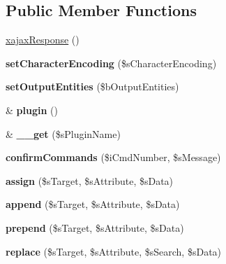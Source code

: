 \subsection*{Public Member Functions}
\begin{DoxyCompactItemize}
\item 
\hyperlink{classxajaxResponse_a0fdc8a869e328a8b4b6472ae7acc0d23}{xajaxResponse} ()
\item 
\hypertarget{classxajaxResponse_ab00a867a4c5dcdf5493329ea47072735}{
{\bfseries setCharacterEncoding} (\$sCharacterEncoding)}
\label{classxajaxResponse_ab00a867a4c5dcdf5493329ea47072735}

\item 
\hypertarget{classxajaxResponse_a59b3d278398a4d2308eb4adfd97668ad}{
{\bfseries setOutputEntities} (\$bOutputEntities)}
\label{classxajaxResponse_a59b3d278398a4d2308eb4adfd97668ad}

\item 
\hypertarget{classxajaxResponse_a61c861817817ae2b530877c1bc26098c}{
\& {\bfseries plugin} ()}
\label{classxajaxResponse_a61c861817817ae2b530877c1bc26098c}

\item 
\hypertarget{classxajaxResponse_aa8f9a828c5861ead579ca879f2b9d915}{
\& {\bfseries \_\-\_\-get} (\$sPluginName)}
\label{classxajaxResponse_aa8f9a828c5861ead579ca879f2b9d915}

\item 
\hypertarget{classxajaxResponse_a6d1eb960316d45c7d1cc9a7b95bdf524}{
{\bfseries confirmCommands} (\$iCmdNumber, \$sMessage)}
\label{classxajaxResponse_a6d1eb960316d45c7d1cc9a7b95bdf524}

\item 
\hypertarget{classxajaxResponse_a251bc90675cc00f65cf0f5a9994af78a}{
{\bfseries assign} (\$sTarget, \$sAttribute, \$sData)}
\label{classxajaxResponse_a251bc90675cc00f65cf0f5a9994af78a}

\item 
\hypertarget{classxajaxResponse_a26286fa978062b4edd37ecd32deccd9e}{
{\bfseries append} (\$sTarget, \$sAttribute, \$sData)}
\label{classxajaxResponse_a26286fa978062b4edd37ecd32deccd9e}

\item 
\hypertarget{classxajaxResponse_a3fa4d9bb5195374f33b3235c35a3f354}{
{\bfseries prepend} (\$sTarget, \$sAttribute, \$sData)}
\label{classxajaxResponse_a3fa4d9bb5195374f33b3235c35a3f354}

\item 
\hypertarget{classxajaxResponse_ab1d50f455d59903d016bbc66e83f0542}{
{\bfseries replace} (\$sTarget, \$sAttribute, \$sSearch, \$sData)}
\label{classxajaxResponse_ab1d50f455d59903d016bbc66e83f0542}


\end{DoxyCompactItemize}
